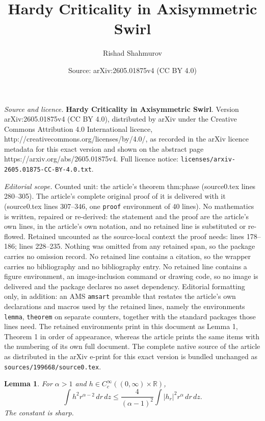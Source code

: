 \documentclass[10pt,a4paper]{amsart}
\title{\textbf{Hardy Criticality in Axisymmetric Swirl}}
\author{Rishad Shahmurov}
\date{Source: arXiv:2605.01875v4 (CC BY 4.0)}
\newtheorem{lemma}{Lemma}
\newcommand{\R}{\mathbb R}
\begin{document}
\maketitle

\noindent\emph{Source and licence.} \textbf{Hardy Criticality in Axisymmetric Swirl}. Version arXiv:2605.01875v4 (CC BY 4.0), distributed by arXiv under the Creative Commons Attribution 4.0 International licence, http://creativecommons.org/licenses/by/4.0/, as recorded in the arXiv licence metadata for this exact version and shown on the abstract page https://arxiv.org/abs/2605.01875v4. Full licence notice: \texttt{licenses/arxiv-2605.01875-CC-BY-4.0.txt}.\par\smallskip

\noindent\textit{Editorial scope.} Counted unit: the article's theorem thm:phase (source0.tex lines 280--305). The article's complete original proof of it is delivered with it (source0.tex lines 307--346, one \texttt{proof} environment of 40 lines). No mathematics is written, repaired or re-derived: the statement and the proof are the article's own lines, in the article's own notation, and no retained line is substituted or re-flowed.  Retained uncounted as the source-local context the proof needs: lines 178--186; lines 228--235.  Nothing was omitted from any retained span, so the package carries no omission record.  No retained line contains a citation, so the wrapper carries no bibliography and no bibliography entry.  No retained line contains a figure environment, an image-inclusion command or drawing code, so no image is delivered and the package declares no asset dependency.  Editorial formatting only, in addition: an AMS \texttt{amsart} preamble that restates the article's own declarations and macros used by the retained lines, namely the environments \texttt{lemma}, \texttt{theorem} on separate counters, together with the standard packages those lines need.  The retained environments print in this document as Lemma 1, Theorem 1 in order of appearance, whereas the article prints the same items with the numbering of its own full document.  The complete native source of the article as distributed in the arXiv e-print for this exact version is bundled unchanged as \texttt{sources/199668/source0.tex}.
\begin{lemma}\label{lem:hardy}
For \(\alpha>1\) and \(h\in C_c^\infty((0,\infty)\times\R)\),
\begin{equation}\label{eq:hardy}
 \int h^2r^{\alpha-2}\,dr\,dz
 \le \frac4{(\alpha-1)^2}
 \int |h_r|^2r^\alpha\,dr\,dz.
\end{equation}
The constant is sharp.
\end{lemma}
\end{document}
